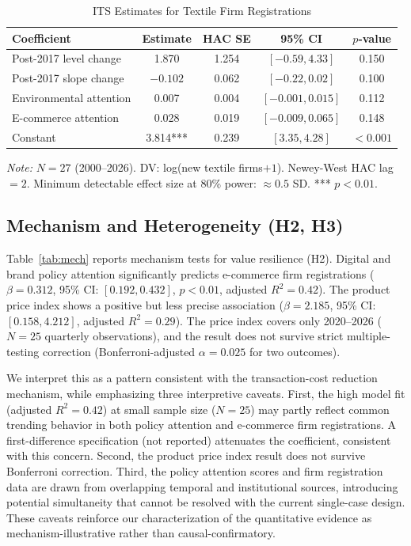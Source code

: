 \documentclass[a4paper, twoside, final]{article}
\begin{document}
\begin{table}[htbp]
\centering
\caption{ITS Estimates for Textile Firm Registrations}
\label{tab:its}
{\small
\begin{tabular}{l c c c c}
\toprule
Coefficient & Estimate & HAC SE & 95\% CI & $p$-value \\
\midrule
Post-2017 level change & 1.870 & 1.254 & $[-0.59, 4.33]$ & 0.150 \\
Post-2017 slope change & $-0.102$ & 0.062 & $[-0.22, 0.02]$ & 0.100 \\
Environmental attention & 0.007 & 0.004 & $[-0.001, 0.015]$ & 0.112 \\
E-commerce attention & 0.028 & 0.019 & $[-0.009, 0.065]$ & 0.148 \\
Constant & 3.814*** & 0.239 & $[3.35, 4.28]$ & $<0.001$ \\
\bottomrule
\end{tabular}}

\vspace{4pt}
{\footnotesize\textit{Note:} $N=27$ (2000--2026). DV: log(new textile firms$+1$). Newey-West HAC lag $=2$. Minimum detectable effect size at 80\% power: $\approx 0.5$ SD. *** $p<0.01$.}
\end{table}

\subsection{Mechanism and Heterogeneity (H2, H3)}
Table~\ref{tab:mech} reports mechanism tests for value resilience (H2). Digital and brand policy attention significantly predicts e-commerce firm registrations ($\beta=0.312$, 95\% CI: $[0.192, 0.432]$, $p<0.01$, adjusted $R^2=0.42$). The product price index shows a positive but less precise association ($\beta=2.185$, 95\% CI: $[0.158, 4.212]$, adjusted $R^2=0.29$). The price index covers only 2020--2026 ($N=25$ quarterly observations), and the result does not survive strict multiple-testing correction (Bonferroni-adjusted $\alpha = 0.025$ for two outcomes).

We interpret this as a pattern consistent with the transaction-cost reduction mechanism, while emphasizing three interpretive caveats. First, the high model fit (adjusted $R^2=0.42$) at small sample size ($N=25$) may partly reflect common trending behavior in both policy attention and e-commerce firm registrations. A first-difference specification (not reported) attenuates the coefficient, consistent with this concern. Second, the product price index result does not survive Bonferroni correction. Third, the policy attention scores and firm registration data are drawn from overlapping temporal and institutional sources, introducing potential simultaneity that cannot be resolved with the current single-case design. These caveats reinforce our characterization of the quantitative evidence as mechanism-illustrative rather than causal-confirmatory.
\end{document}

